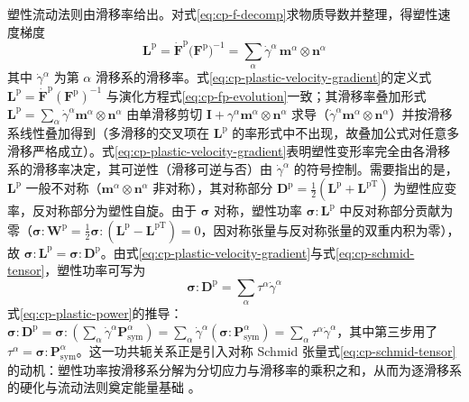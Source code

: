 塑性流动法则由滑移率给出。对式\eqref{eq:cp-f-decomp}求物质导数并整理，得塑性速度梯度
\begin{equation}
  \mathbf{L}^{\mathrm{p}}=\dot{\mathbf{F}}^{\mathrm{p}}\bigl(\mathbf{F}^{\mathrm{p}}\bigr)^{-1}
  =\sum_{\alpha}\dot{\gamma}^{\alpha}\,\mathbf{m}^{\alpha}\otimes\mathbf{n}^{\alpha}
  \label{eq:cp-plastic-velocity-gradient}
\end{equation}
其中 $\dot{\gamma}^{\alpha}$ 为第 $\alpha$ 滑移系的滑移率。式\eqref{eq:cp-plastic-velocity-gradient}的定义式 $\mathbf{L}^{\mathrm{p}}=\dot{\mathbf{F}}^{\mathrm{p}}(\mathbf{F}^{\mathrm{p}})^{-1}$ 与演化方程式\eqref{eq:cp-fp-evolution}一致；其滑移率叠加形式 $\mathbf{L}^{\mathrm{p}}=\sum_{\alpha}\dot{\gamma}^{\alpha}\mathbf{m}^{\alpha}\otimes\mathbf{n}^{\alpha}$ 由单滑移剪切 $\mathbf{I}+\gamma^{\alpha}\mathbf{m}^{\alpha}\otimes\mathbf{n}^{\alpha}$ 求导（$\dot{\gamma}^{\alpha}\mathbf{m}^{\alpha}\otimes\mathbf{n}^{\alpha}$）并按滑移系线性叠加得到（多滑移的交叉项在 $\mathbf{L}^{\mathrm{p}}$ 的率形式中不出现，故叠加公式对任意多滑移严格成立）。式\eqref{eq:cp-plastic-velocity-gradient}表明塑性变形率完全由各滑移系的滑移率决定，其可逆性（滑移可逆与否）由 $\dot{\gamma}^{\alpha}$ 的符号控制。需要指出的是，$\mathbf{L}^{\mathrm{p}}$ 一般不对称（$\mathbf{m}^{\alpha}\otimes\mathbf{n}^{\alpha}$ 非对称），其对称部分 $\mathbf{D}^{\mathrm{p}}=\tfrac{1}{2}(\mathbf{L}^{\mathrm{p}}+\mathbf{L}^{\mathrm{pT}})$ 为塑性应变率，反对称部分为塑性自旋。由于 $\boldsymbol{\sigma}$ 对称，塑性功率 $\boldsymbol{\sigma}:\mathbf{L}^{\mathrm{p}}$ 中反对称部分贡献为零（$\boldsymbol{\sigma}:\mathbf{W}^{\mathrm{p}}=\tfrac{1}{2}\boldsymbol{\sigma}:(\mathbf{L}^{\mathrm{p}}-\mathbf{L}^{\mathrm{pT}})=0$，因对称张量与反对称张量的双重内积为零），故 $\boldsymbol{\sigma}:\mathbf{L}^{\mathrm{p}}=\boldsymbol{\sigma}:\mathbf{D}^{\mathrm{p}}$。由式\eqref{eq:cp-plastic-velocity-gradient}与式\eqref{eq:cp-schmid-tensor}，塑性功率可写为
\begin{equation}
  \boldsymbol{\sigma}:\mathbf{D}^{\mathrm{p}}=\sum_{\alpha}\tau^{\alpha}\dot{\gamma}^{\alpha}
  \label{eq:cp-plastic-power}
\end{equation}
式\eqref{eq:cp-plastic-power}的推导：$\boldsymbol{\sigma}:\mathbf{D}^{\mathrm{p}}=\boldsymbol{\sigma}:(\sum_{\alpha}\dot{\gamma}^{\alpha}\mathbf{P}^{\alpha}_{\mathrm{sym}})=\sum_{\alpha}\dot{\gamma}^{\alpha}(\boldsymbol{\sigma}:\mathbf{P}^{\alpha}_{\mathrm{sym}})=\sum_{\alpha}\tau^{\alpha}\dot{\gamma}^{\alpha}$，其中第三步用了 $\tau^{\alpha}=\boldsymbol{\sigma}:\mathbf{P}^{\alpha}_{\mathrm{sym}}$。这一功共轭关系正是引入对称 Schmid 张量式\eqref{eq:cp-schmid-tensor}的动机：塑性功率按滑移系分解为分切应力与滑移率的乘积之和，从而为逐滑移系的硬化与流动法则奠定能量基础 \cite{Asaro1983}。

